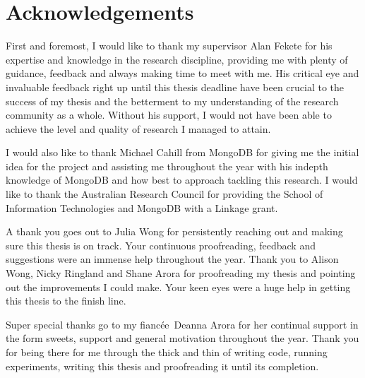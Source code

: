 \chapter*{Acknowledgements}

\newcommand{\gf}{fianc\'{e}e}

First and foremost, I would like to thank my supervisor Alan Fekete for his expertise and knowledge in the research discipline, providing me with plenty of guidance, feedback and always making time to meet with me. His critical eye and invaluable feedback right up until this thesis deadline have been crucial to the success of my thesis and the betterment to my understanding of the research community as a whole. Without his support, I would not have been able to achieve the level and quality of research I managed to attain. 

I would also like to thank Michael Cahill from MongoDB for giving me the initial idea for the project and assisting me throughout the year with his indepth knowledge of MongoDB and how best to approach tackling this research. I would like to thank the Australian Research Council for providing the School of Information Technologies and MongoDB with a Linkage grant.

A thank you goes out to Julia Wong for persistently reaching out and making sure this thesis is on track. Your continuous proofreading, feedback and suggestions were an immense help throughout the year. Thank you to Alison Wong, Nicky Ringland and Shane Arora for proofreading my thesis and pointing out the improvements I could make. Your keen eyes were a huge help in getting this thesis to the finish line. 

Super special thanks go to my \gf \ Deanna Arora for her continual support in the form sweets, support and general motivation throughout the year. Thank you for being there for me through the thick and thin of writing code, running experiments, writing this thesis and proofreading it until its completion.